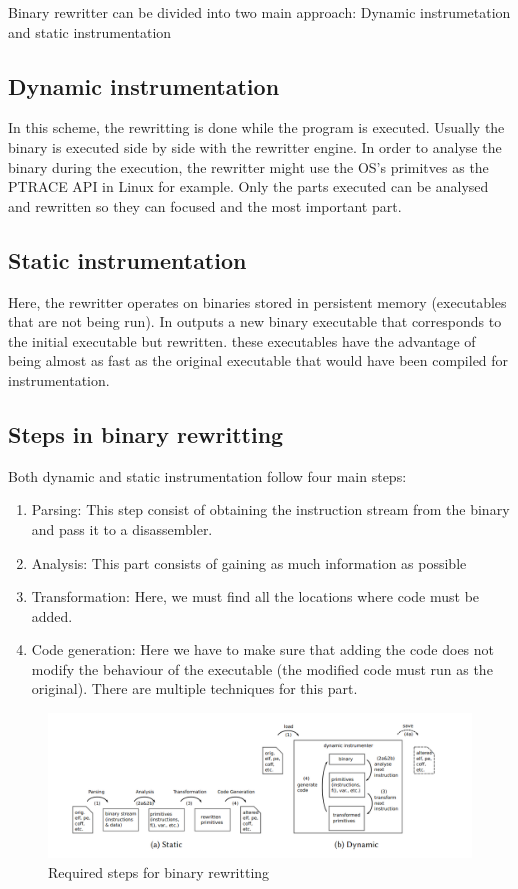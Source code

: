 \documentclass[a4paper,11pt,oneside]{report}
\begin{document}
Binary rewritter can be divided into two main approach: Dynamic instrumetation
and static instrumentation

\subsection{Dynamic instrumentation}
In this scheme, the rewritting is done while the program is executed. Usually
the binary is executed side by side with the rewritter engine. In order
to analyse the binary during the execution, the rewritter might use the OS's
primitves as the PTRACE API in Linux for example.  Only the parts executed can
be analysed and rewritten so they can focused and the most important part.
\subsection{Static instrumentation}
Here, the rewritter operates on binaries stored in persistent memory
(executables that are not being run). In outputs a new binary executable that
corresponds to the initial executable but rewritten. these executables have the
advantage of being almost as fast as the original executable that would have
been compiled for instrumentation.



\subsection{Steps in binary rewritting}
Both dynamic and static instrumentation follow four main steps:
\begin{enumerate}
    \item Parsing:
        This step consist of obtaining the instruction stream from the binary
        and pass it to a disassembler.
    \item Analysis:
        This part consists of gaining as much information as possible
    \item Transformation:
        Here, we must find all the locations where  code must be added. 
    \item Code generation:
        Here we have to make sure that adding the code does not modify the
        behaviour of the executable (the modified code must run as the
        original). There are multiple techniques for this part.
\end{enumerate}
\begin{figure}[h]
    \includegraphics[width=\linewidth]{required_steps.png}
    \caption{Required steps for binary rewritting}
    \label{fig:steps}
  \end{figure}
\end{document}
